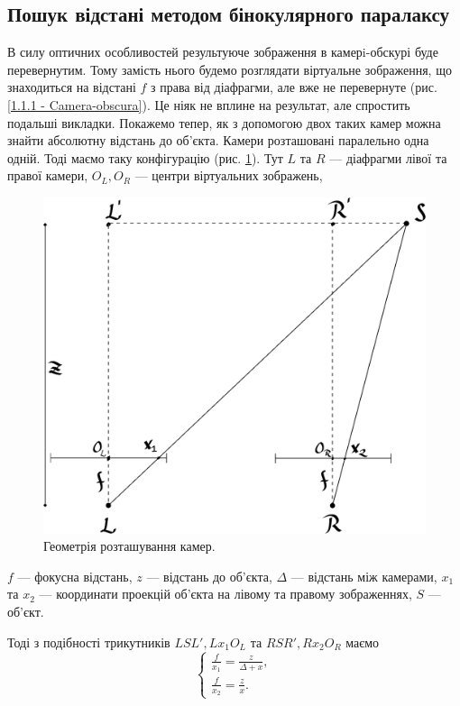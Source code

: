 \subsection{Пошук відстані методом бінокулярного паралаксу}
В силу оптичних особливостей результуюче зображення в камерi-обскурі буде перевернутим. Тому замість нього будемо розглядати віртуальне зображення, що знаходиться на відстані $f$ з права від діафрагми, але вже не перевернуте (рис. \ref{1.1.1 - Camera-obscura}).
Це ніяк не вплине на результат, але спростить подальші викладки.
Покажемо тепер, як з допомогою двох таких камер можна знайти абсолютну відстань до об'єкта. Камери розташовані паралельно одна одній.
Тоді маємо таку конфігурацію (рис. \ref{geometry}). Тут $L$ та $R$ --- діафрагми лівої та правої камери, $O_L, O_R$ --- центри віртуальних зображень,
\begin{figure}[!htb]
	\centering
	\includegraphics[scale = 0.6]{geometry.pdf}
	\caption{Геометрія розташування камер.}
	\label{geometry}
\end{figure}
$f$ --- фокусна відстань, $z$ --- відстань до об'єкта, $\Delta$ --- відстань між камерами, $x_1$ та $x_2$ --- координати проекцій об'єкта на лівому та правому зображеннях, $S$ --- об'єкт.

Тоді з подібності трикутників $LSL' , Lx_1O_L$ та $RSR' , Rx_2O_R$ маємо
$$\begin{cases} \frac{f}{x_1} = \frac{z}{\Delta + x} , \\ \frac{f}{x_2} = \frac{z}{x} . \end{cases}$$
	
